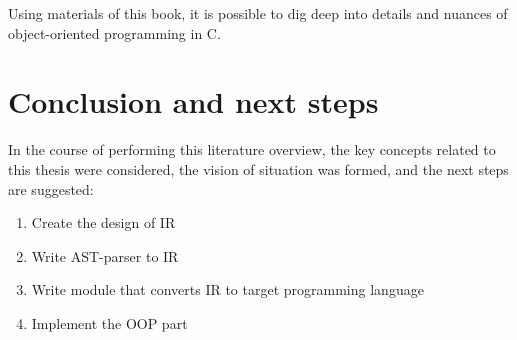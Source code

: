 Using materials of this book, it is possible to dig deep into details and nuances of object-oriented programming in C.

\section{Conclusion and next steps}

In the course of performing this literature overview, the key concepts related to this thesis were considered, the vision of situation was formed, and the next steps are suggested:
\begin{enumerate}
    \item Create the design of IR
    \item Write AST-parser to IR
    \item Write module that converts IR to target programming language
    \item Implement the OOP part
\end{enumerate}
